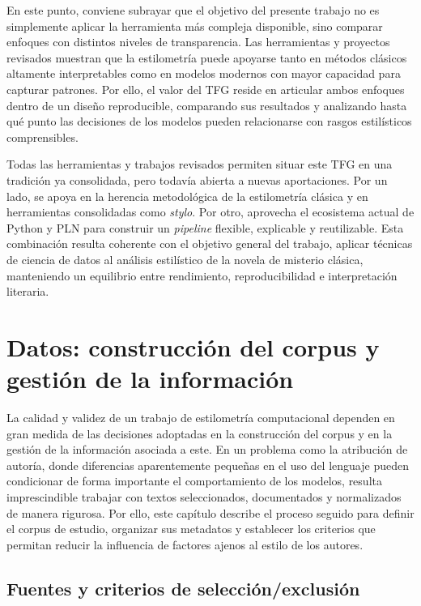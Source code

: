 \documentclass[IB]{TFUOC}%
\begin{document}
En este punto, conviene subrayar que el objetivo del presente trabajo no es simplemente aplicar la herramienta más compleja disponible, sino comparar enfoques con distintos niveles de transparencia. Las herramientas y proyectos revisados muestran que la estilometría puede apoyarse tanto en métodos clásicos altamente interpretables como en modelos modernos con mayor capacidad para capturar patrones. Por ello, el valor del TFG reside en articular ambos enfoques dentro de un diseño reproducible, comparando sus resultados y analizando hasta qué punto las decisiones de los modelos pueden relacionarse con rasgos estilísticos comprensibles.

Todas las herramientas y trabajos revisados permiten situar este TFG en una tradición ya consolidada, pero todavía abierta a nuevas aportaciones. Por un lado, se apoya en la herencia metodológica de la estilometría clásica y en herramientas consolidadas como \textit{stylo}. Por otro, aprovecha el ecosistema actual de Python y PLN para construir un \textit{pipeline} flexible, explicable y reutilizable. Esta combinación resulta coherente con el objetivo general del trabajo, aplicar técnicas de ciencia de datos al análisis estilístico de la novela de misterio clásica, manteniendo un equilibrio entre rendimiento, reproducibilidad e interpretación literaria.

\chapter{Datos: construcción del corpus y gestión de la información}

La calidad y validez de un trabajo de estilometría computacional dependen en gran medida de las decisiones adoptadas en la construcción del corpus y en la gestión de la información asociada a este. En un problema como la atribución de autoría, donde diferencias aparentemente pequeñas en el uso del lenguaje pueden condicionar de forma importante el comportamiento de los modelos, resulta imprescindible trabajar con textos seleccionados, documentados y normalizados de manera rigurosa. Por ello, este capítulo describe el proceso seguido para definir el corpus de estudio, organizar sus metadatos y establecer los criterios que permitan reducir la influencia de factores ajenos al estilo de los autores.

\section{Fuentes y criterios de selección/exclusión}
\end{document}

